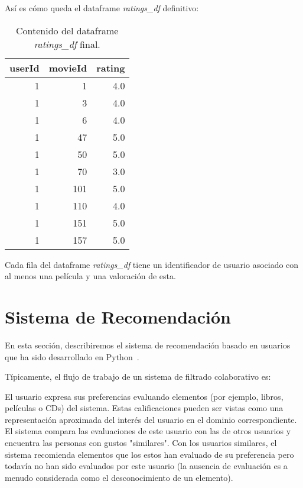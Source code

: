 \documentclass{uimppracticas}
\begin{document}
Así es cómo queda el dataframe \textit{ratings\_df} definitivo:

\begin{table}[H]
	\centering
	\begin{tabular}{rrr}
		\toprule
		userId &  movieId &  rating \\
		\midrule
		1 &        1 &     4.0 \\
		1 &        3 &     4.0 \\
		1 &        6 &     4.0 \\
		1 &       47 &     5.0 \\
		1 &       50 &     5.0 \\
		1 &       70 &     3.0 \\
		1 &      101 &     5.0 \\
		1 &      110 &     4.0 \\
		1 &      151 &     5.0 \\
		1 &      157 &     5.0 \\
		\bottomrule
	\end{tabular}
	\caption{Contenido del dataframe \textit{ratings\_df} final.}
	\label{ratings_df_final}
\end{table}

Cada fila del dataframe \textit{ratings\_df} tiene un identificador de usuario asociado con al menos una película y una valoración de esta. 

\section{Sistema de Recomendación}\label{sistema_recomendacion}

En esta sección, describiremos el sistema de recomendación basado en usuarios que ha sido desarrollado en Python~\cite{GitHubRepo}.

Típicamente, el flujo de trabajo de un sistema de filtrado colaborativo es:

El usuario expresa sus preferencias evaluando elementos (por ejemplo, libros, películas o CDs) del sistema. Estas calificaciones pueden ser vistas como una representación aproximada del interés del usuario en el dominio correspondiente.
El sistema compara las evaluaciones de este usuario con las de otros usuarios y encuentra las personas con gustos "similares".
Con los usuarios similares, el sistema recomienda elementos que los estos han evaluado de su preferencia pero todavía no han sido evaluados por este usuario (la ausencia de evaluación es a menudo considerada como el desconocimiento de un elemento).
\end{document}
